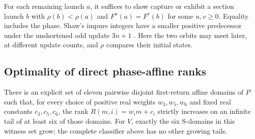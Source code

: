 For each remaining launch $a$, it suffices to show capture or exhibit a
section launch $b$ with $\rho(b)<\rho(a)$ and $F^u(a)=F^v(b)$ for
some $u,v\ge0$. Equality includes the phase. Shaw's impure integers
have a smaller positive predecessor under the unshortened odd update
$3n+1$ \cite[Definition~2.1 and Theorem~3.1]{shaw-2006}. Here the two
orbits may meet later, at different update counts, and $\rho$ compares
their initial states.

\subsection{Optimality of direct phase-affine ranks}

\begin{proposition}
\label{prop:seven-six-barrier}
There is an explicit set of eleven pairwise disjoint first-return
affine domains of $P$ such that, for every choice of positive real
weights $w_3,w_5,w_6$ and fixed real constants $c_3,c_5,c_6$, the
rank $R(m,i)=w_i m+c_i$ strictly increases on an infinite tail of at
least six of those domains.  For $V$, exactly the six S-domains in
this witness set grow; the complete classifier above has no other
growing tails.
\end{proposition}

